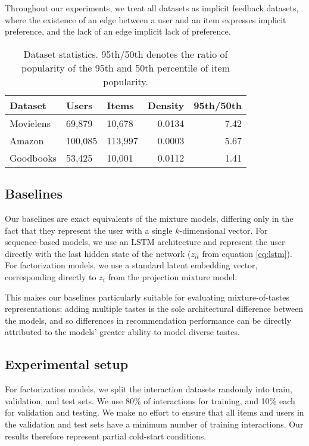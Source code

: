\documentclass[sigconf]{acmart}
\begin{document}
Throughout our experiments, we treat all datasets as implicit feedback datasets, where the existence of an edge between a user and an item expresses implicit preference, and the lack of an edge implicit lack of preference.

\begin{table}
  \caption{Dataset statistics. 95th/50th denotes the ratio of popularity of the 95th and 50th percentile of item popularity.}
  \label{tab:datasets}
\begin{tabularx}{\columnwidth}{lllrr}
\toprule
 Dataset       & Users   & Items   &   Density &   95th/50th \\
\midrule
 Movielens & 69,879  & 10,678  &    0.0134 &      7.42 \\
 Amazon        & 100,085 & 113,997 &    0.0003 &      5.67 \\
 Goodbooks     & 53,425  & 10,001  &    0.0112 &      1.41 \\
\bottomrule
\end{tabularx}
\end{table}

\subsection{Baselines}
Our baselines are exact equivalents of the mixture models, differing only in the fact that they represent the user with a single $k$-dimensional vector. For sequence-based models, we use an LSTM architecture and represent the user directly with the last hidden state of the network ($z_{it}$ from equation \ref{eq:lstm}). For factorization models, we use a standard latent embedding vector, corresponding directly to $z_i$ from the projection mixture model.

This makes our baselines particularly suitable for evaluating mixture-of-tastes representations: adding multiple tastes is the sole architectural difference between the models, and so differences in recommendation performance can be directly attributed to the models' greater ability to model diverse tastes.

\subsection{Experimental setup}
For factorization models, we split the interaction datasets randomly into train, validation, and test sets. We use 80\% of interactions for training, and 10\% each for validation and testing. We make no effort to ensure that all items and users in the validation and test sets have a minimum number of training interactions. Our results therefore represent partial cold-start conditions.
\end{document}
